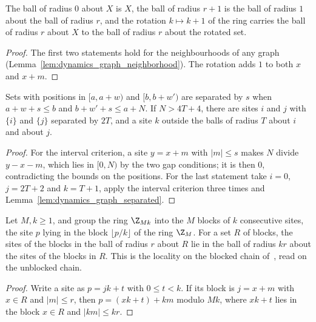 \begin{lemma}
    \label{lem:sites_ring_ball}
    \leanok
    The ball of radius $0$ about $X$ is $X$, the ball of radius $r+1$ is the ball of
    radius $1$ about the ball of radius $r$, and the rotation $k\mapsto k+1$ of the ring
    carries the ball of radius $r$ about $X$ to the ball of radius $r$ about the rotated
    set.
\end{lemma}
\begin{proof}\leanok
    The first two statements hold for the neighbourhoods of any graph
    (Lemma~\ref{lem:dynamics_graph_neighborhood}). The rotation adds $1$ to both $x$ and
    $x+m$.
\end{proof}

\begin{lemma}
    \label{lem:sites_ring_separated}
    \leanok
    Sets with positions in $\lbrack a,a+w)$ and $\lbrack b,b+w')$ are separated by $s$ when
    $a+w+s\le b$ and $b+w'+s\le a+N$. If $N>4T+4$, there are sites $i$ and $j$ with $\{i\}$
    and $\{j\}$ separated by $2T$, and a site $k$ outside the balls of radius $T$ about $i$
    and about $j$.
\end{lemma}
\begin{proof}\leanok
    For the interval criterion, a site $y=x+m$ with $\lvert m\rvert\le s$ makes $N$ divide
    $y-x-m$, which lies in $[0,N)$ by the two gap conditions; it is then $0$,
    contradicting the bounds on the positions. For the last statement take $i=0$,
    $j=2T+2$ and $k=T+1$, apply the interval criterion three times and
    Lemma~\ref{lem:dynamics_graph_separated}.
\end{proof}

\begin{theorem}
    \label{thm:sites_ring_block_ball}
    \leanok
    Let $M,k\ge1$, and group the ring $\Z_{Mk}$ into the $M$ blocks of $k$ consecutive
    sites, the site $p$ lying in the block $\lfloor p/k\rfloor$ of the ring $\Z_M$. For a
    set $R$ of blocks, the sites of the blocks in the ball of radius $r$ about $R$ lie in the
    ball of radius $kr$ about the sites of the blocks in $R$. This is the locality on the
    blocked chain of~\cite[main text]{Piroli2021LOCC}, read on the unblocked chain.
\end{theorem}
\begin{proof}\leanok
    Write a site as $p=jk+t$ with $0\le t<k$. If its block is $j=x+m$ with $x\in R$ and
    $\lvert m\rvert\le r$, then $p=(xk+t)+km$ modulo $Mk$, where $xk+t$ lies in the block
    $x\in R$ and $\lvert km\rvert\le kr$.
\end{proof}

